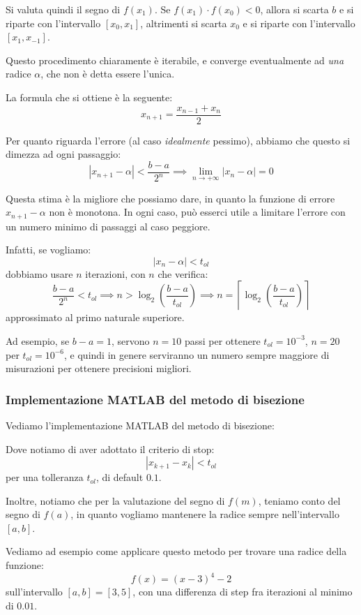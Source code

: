 \documentclass[a4paper,11pt]{article}
\begin{document}
Si valuta quindi il segno di $f(x_1)$.
Se $f(x_1) \cdot f(x_0) < 0$, allora si scarta $b$ e si riparte con l'intervallo $[x_0, x_1]$, altrimenti si scarta $x_0$ e si riparte con l'intervallo $[x_1, x_{-1}]$.

Questo procedimento chiaramente è iterabile, e converge eventualmente ad \textit{una} radice $\alpha$, che non è detta essere l'unica.

La formula che si ottiene è la seguente:
$$
x_{n + 1} = \frac{x_{n - 1} + x_n}{2} 
$$

Per quanto riguarda l'errore (al caso \textit{idealmente} pessimo), abbiamo che questo si dimezza ad ogni passaggio:
$$
| x_{n + 1} - \alpha| < \frac{b - a}{2^n} \implies \lim_{n \rightarrow +\infty} |x_n - \alpha| = 0
$$

Questa stima è la migliore che possiamo dare, in quanto la funzione di errore $x_{n + 1} - \alpha$ non è monotona.
In ogni caso, può esserci utile a limitare l'errore con un numero minimo di passaggi al caso peggiore.

Infatti, se vogliamo:
$$
|x_n - \alpha| < t_{ol}
$$
dobbiamo usare $n$ iterazioni, con $n$ che verifica:
$$
\frac{b - a}{2^n} < t_{ol} \implies n > \log_2 \left( \frac{b - a}{t_{ol}} \right) \implies n = \left\lceil \log_2 \left( \frac{b - a}{t_{ol}} \right) \right\rceil
$$
approssimato al primo naturale superiore.

Ad esempio, se $b - a = 1$, servono $n = 10$ passi per ottenere $t_{ol} = 10^{-3}$, $n = 20$ per $t_{ol} = 10^{-6}$, e quindi in genere serviranno un numero sempre maggiore di misurazioni per ottenere precisioni migliori.

\subsubsection{Implementazione MATLAB del metodo di bisezione}
Vediamo l'implementazione MATLAB del metodo di bisezione:
\lstset{style=codestyle, language=MATLAB}


Dove notiamo di aver adottato il criterio di stop:
$$
| x_{k + 1} - x_k | < t_{ol}
$$
per una tolleranza $t_{ol}$, di default $0.1$.

Inoltre, notiamo che per la valutazione del segno di $f(m)$, teniamo conto del segno di $f(a)$, in quanto vogliamo mantenere la radice sempre nell'intervallo $[a, b]$.

\par\smallskip

Vediamo ad esempio come applicare questo metodo per trovare una radice della funzione:
$$
f(x) = \left(x-3\right)^{4}-2
$$
sull'intervallo $[a, b] = [3, 5]$, con una differenza di step fra iterazioni al minimo di $0.01$.
\end{document}
